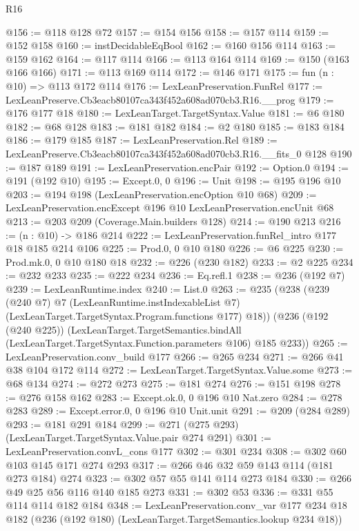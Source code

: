 \begin{lexlean}{R16}
\begin{coremodule}
@156 := @118 @128 @72
@157 := @154 @156
@158 := @157 @114
@159 := @152 @158
@160 := instDecidableEqBool
@162 := @160 @156 @114
@163 := @159 @162
@164 := @117 @114
@166 := @113 @164 @114
@169 := @150 (@163 @166 @166)
@171 := @113 @169 @114
@172 := @146 @171
@175 := fun (n : @10) => @113 @172 @114
@176 := LexLeanPreservation.FunRel
@177 := LexLeanPreserve.Cb3eacb80107ca343f452a608ad070cb3.R16.__prog
@179 := @176 @177 @18
@180 := LexLeanTarget.TargetSyntax.Value
@181 := @6 @180
@182 := @68 @128
@183 := @181 @182
@184 := @2 @180
@185 := @183 @184
@186 := @179 @185
@187 := LexLeanPreservation.Rel
@189 := LexLeanPreserve.Cb3eacb80107ca343f452a608ad070cb3.R16.__fits_0 @128
@190 := @187 @189
@191 := LexLeanPreservation.encPair
@192 := Option.{0}
@194 := @191 (@192 @10)
@195 := Except.{0, 0}
@196 := Unit
@198 := @195 @196 @10
@203 := @194 @198 (LexLeanPreservation.encOption @10 @68)
@209 := LexLeanPreservation.encExcept @196 @10 LexLeanPreservation.encUnit @68
@213 := @203 @209 (Coverage.Main.builders @128)
@214 := @190 @213
@216 := (n : @10) -> @186 @214
@222 := LexLeanPreservation.funRel_intro @177 @18 @185 @214 @106
@225 := Prod.{0, 0} @10 @180
@226 := @6 @225
@230 := Prod.mk.{0, 0} @10 @180 @18
@232 := @226 (@230 @182)
@233 := @2 @225
@234 := @232 @233
@235 := @222 @234
@236 := Eq.refl.{1}
@238 := @236 (@192 @7)
@239 := LexLeanRuntime.index
@240 := List.{0}
@263 := @235
    (@238
      (@239
        (@240 @7)
        @7
        (LexLeanRuntime.instIndexableList @7)
        (LexLeanTarget.TargetSyntax.Program.functions @177)
        @18))
    (@236
      (@192 (@240 @225))
      (LexLeanTarget.TargetSemantics.bindAll
        (LexLeanTarget.TargetSyntax.Function.parameters @106)
        @185
        @233))
@265 := LexLeanPreservation.conv_build @177
@266 := @265 @234
@271 := @266 @41 @38 @104 @172 @114
@272 := LexLeanTarget.TargetSyntax.Value.some
@273 := @68 @134
@274 := @272 @273
@275 := @181 @274
@276 := @151 @198
@278 := @276 @158 @162
@283 := Except.ok.{0, 0} @196 @10 Nat.zero
@284 := @278 @283
@289 := Except.error.{0, 0} @196 @10 Unit.unit
@291 := @209 (@284 @289)
@293 := @181 @291 @184
@299 := @271 (@275 @293) (LexLeanTarget.TargetSyntax.Value.pair @274 @291)
@301 := LexLeanPreservation.convL_cons @177
@302 := @301 @234
@308 := @302 @60 @103 @145 @171 @274 @293
@317 := @266 @46 @32 @59 @143 @114 (@181 @273 @184) @274
@323 := @302 @57 @55 @141 @114 @273 @184
@330 := @266 @49 @25 @56 @116 @140 @185 @273
@331 := @302 @53
@336 := @331 @55 @114 @114 @182 @184
@348 := LexLeanPreservation.conv_var
    @177
    @234
    @18
    @182
    (@236 (@192 @180) (LexLeanTarget.TargetSemantics.lookup @234 @18))

\end{coremodule}
\end{lexlean}
